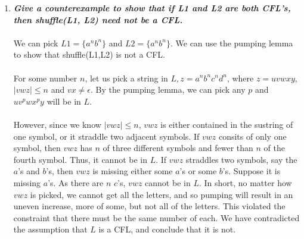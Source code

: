 \documentclass[a4paper]{article}
\begin{document}
\begin{enumerate}
\begin{enumerate}[1.]
\item \textbf{\emph{Give a counterexample to show that if L1 and L2 are both CFL's, then shuffle(L1, L2) need not be a CFL.}} \\
\\
We can pick $L1 = \{a^nb^n\}$ and $L2 = \{a^nb^n\}$. We can use the pumping lemma to show that shuffle(L1,L2) is not a CFL. \\
\\
For some number $n$, let us pick a string in $L, z = a^nb^nc^nd^n$, where $z = uvwxy$, $|vwz| \leq n$ and $vx \neq \epsilon$. By the pumping lemma, we can pick any $p$ and $uv^pwx^py$ will be in $L$. \\
\\
However, since we know $|vwz| \leq n$, $vwz$ is either contained in the sustring of one symbol, or it straddle two adjacent symbols. If $vwz$ consits of only one symbol, then $vwz$ has $n$ of three different symbols and fewer than $n$ of the fourth symbol. Thus, it cannot be in $L$. If $vwz$ straddles two symbols, say the $a$'s and $b$'s, then $vwz$ is missing either some $a$'s or some $b$'s. Suppose it is missing $a$'s. As there are $n$ $c$'s, $vwz$ cannot be in $L$. In short, no matter how $vwz$ is picked, we cannot get all the letters, and so pumping will result in an uneven increase, more of some, but not all of the letters. This violated the constraint that there must be the same number of each. We have contradicted the assumption that $L$ is a CFL, and conclude that it is not. \\
\end{enumerate}




\end{enumerate}
\end{document}
